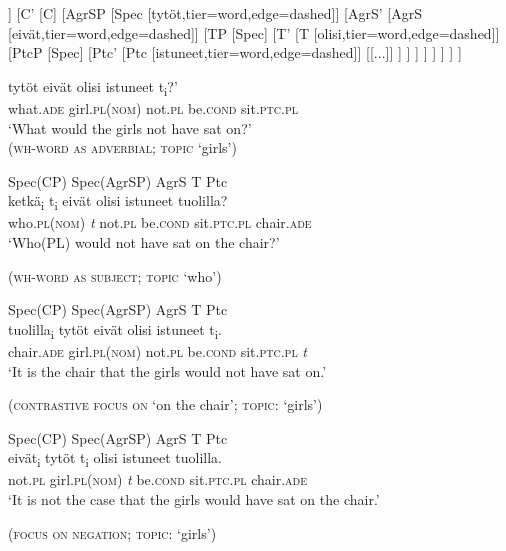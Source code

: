 \documentclass[output=paper]{langsci/langscibook}
\begin{document}
\ea\label{ex:nikanne:9}
\begin{forest} %
[CP\is{complementizer} [Spec [millä\textsubscript{i},tier=word,edge=dashed] ] [C' [C] [AgrSP [Spec [tytöt,tier=word,edge=dashed]] [AgrS' [AgrS [eivät,tier=word,edge=dashed]] [TP [Spec] [T' [T [olisi,tier=word,edge=dashed]] [PtcP [Spec] [Ptc' [Ptc [istuneet,tier=word,edge=dashed]] [{[}...{]}] ] ] ] ] ] ] ] ] 
\end{forest}
\begin{xlista}
\ex  \label{ex:nikanne:9a}
\gll   {}                  tytöt   eivät              olisi       istuneet                   t\textsubscript{i}?’\\
what.\textsc{ade}   girl.\textsc{pl}(\textsc{nom}) not.\textsc{pl}         be.\textsc{cond}        sit.\textsc{ptc}.\textsc{pl} \\
\glt  ‘What would the girls not have sat on?’ \\
({\scshape wh-word as adverbial}; \textsc{topic} ‘girls’)

\ex \label{ex:nikanne:9b}
\glll Spec(CP)  Spec(AgrSP)   AgrS            T       Ptc\\
ketkä\textsubscript{i}     t\textsubscript{i}   eivät   olisi   istuneet   tuolilla?\\
  who.\textsc{pl}(\textsc{nom}) \textit{t} not.\textsc{pl} be.\textsc{cond} sit.\textsc{ptc}.\textsc{pl}  chair.\textsc{ade}\\
\glt  ‘Who(PL) would not have sat on the chair?’ 

({\scshape wh-word as subject}; \textsc{topic} ‘who’)

\ex \label{ex:nikanne:9c}
\glll Spec(CP)  Spec(AgrSP)   AgrS            T       Ptc\\
tuolilla\textsubscript{i}  tytöt   eivät   olisi   istuneet   t\textsubscript{i}.\\
chair.\textsc{ade}  girl.\textsc{pl}(\textsc{nom}) not.\textsc{pl} be.\textsc{cond} sit.\textsc{ptc}.\textsc{pl} \textit{t}\\
\glt ‘It is the chair that the girls would not have sat on.’ 

(\textsc{contrastive focus on} ‘on the chair’; \textsc{topic}: ‘girls’)

\largerpage[2]
\ex \label{ex:nikanne:9d}
\glll   Spec(CP)  Spec(AgrSP)   AgrS            T       Ptc\\
        eivät\textsubscript{i}  tytöt     t\textsubscript{i}  olisi   istuneet   tuolilla.\\
        not.\textsc{pl}  girl.\textsc{pl}(\textsc{nom})  \textit{t}   be.\textsc{cond}   sit.\textsc{ptc}.\textsc{pl} chair.\textsc{ade}\\
\glt ‘It is not the case that the girls would have sat on the chair.’ 


({\scshape focus on negation}; \textsc{topic}: ‘girls’)
\end{xlista}
\z
\end{document}
